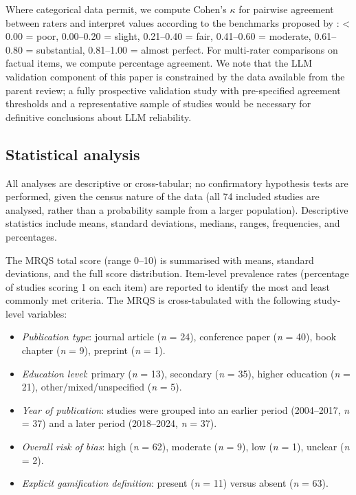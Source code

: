 \documentclass[etq]{acnsart}
\begin{document}
	Where categorical data permit, we compute Cohen's $\kappa$ \cite{Cohen1960} for pairwise agreement between raters and interpret values according to the benchmarks proposed by \citet{LandisKoch1977}: < 0.00 = poor, 0.00--0.20 = slight, 0.21--0.40 = fair, 0.41--0.60 = moderate, 0.61--0.80 = substantial, 0.81--1.00 = almost perfect. For multi-rater comparisons on factual items, we compute percentage agreement. We note that the LLM validation component of this paper is constrained by the data available from the parent review; a fully prospective validation study with pre-specified agreement thresholds and a representative sample of studies would be necessary for definitive conclusions about LLM reliability.
	
	\subsection{Statistical analysis}
	\label{sec:methods_stats}
	
	All analyses are descriptive or cross-tabular; no confirmatory hypothesis tests are performed, given the census nature of the data (all 74 included studies are analysed, rather than a probability sample from a larger population). Descriptive statistics include means, standard deviations, medians, ranges, frequencies, and percentages.
	
	The MRQS total score (range 0--10) is summarised with means, standard deviations, and the full score distribution. Item-level prevalence rates (percentage of studies scoring 1 on each item) are reported to identify the most and least commonly met criteria. The MRQS is cross-tabulated with the following study-level variables:
	
	\begin{itemize}%
		\item \textit{Publication type}: journal article (\textit{n} = 24), conference paper (\textit{n} = 40), book chapter (\textit{n} = 9), preprint (\textit{n} = 1).
		\item \textit{Education level}: primary (\textit{n} = 13), secondary (\textit{n} = 35), higher education (\textit{n} = 21), other/mixed/unspecified (\textit{n} = 5).
		\item \textit{Year of publication}: studies were grouped into an earlier period (2004--2017, \textit{n} = 37) and a later period (2018--2024, \textit{n} = 37).
		\item \textit{Overall risk of bias}: high (\textit{n} = 62), moderate (\textit{n} = 9), low (\textit{n} = 1), unclear (\textit{n} = 2).
		\item \textit{Explicit gamification definition}: present (\textit{n} = 11) versus absent (\textit{n} = 63).
	\end{itemize}
	
\end{document}
